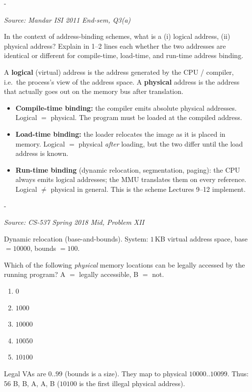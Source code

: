 \documentclass[11pt,a4paper]{article}
\makeatletter
\newcommand{\keepspace}[1]{\par\penalty-100\begingroup
  \setlength{\dimen@}{#1}\dimen@ii\pagegoal\advance\dimen@ii-\pagetotal
  \ifdim\dimen@>\dimen@ii\ifdim\dimen@ii>\z@\vfil\fi\break\fi\endgroup}
\newcounter{qn}[section]
\newenvironment{Qn}[4]{%
  \refstepcounter{qn}\keepspace{7\baselineskip}%
  \begin{tcolorbox}[qboxstyle, title={Q\thesection.\theqn\ \ [#1 \textbar\ #2]\ \ #4}]%
  {\footnotesize\color{g3}\textit{Source: #3}}\par\smallskip%
}{%
  \end{tcolorbox}%
}
\newenvironment{Sol}{%
  \begin{tcolorbox}[sboxstyle, title={Solution}]%
}{%
  \end{tcolorbox}\vspace{0.35em}%
}
\makeatother
\begin{document}
\begin{Qn}{Easy-Medium}{Lect 8}{Mandar ISI 2011 End-sem, Q3(a)}{Logical vs.\ physical addresses, and compile- / load- / run-time binding}
In the context of address-binding schemes, what is a (i) logical
address, (ii) physical address? Explain in 1--2 lines each whether the
two addresses are identical or different for compile-time, load-time,
and run-time address binding.
\end{Qn}
\begin{Sol}
A \textbf{logical} (virtual) address is the address generated by the
CPU / compiler, i.e.\ the process's view of the address space. A
\textbf{physical} address is the address that actually goes out on the
memory bus after translation.

\begin{itemize}
  \item \textbf{Compile-time binding:} the compiler emits absolute
        physical addresses. Logical $=$ physical. The program must be
        loaded at the compiled address.
  \item \textbf{Load-time binding:} the loader relocates the image as
        it is placed in memory. Logical $=$ physical \emph{after}
        loading, but the two differ until the load address is known.
  \item \textbf{Run-time binding} (dynamic relocation, segmentation,
        paging): the CPU always emits logical addresses; the MMU
        translates them on every reference. Logical $\ne$ physical in
        general. This is the scheme Lectures 9--12 implement.
\end{itemize}
\end{Sol}

\begin{Qn}{Easy-Medium}{Lect 9}{CS-537 Spring 2018 Mid, Problem XII}{Which physical addresses can this base-and-bounds process touch?}
Dynamic relocation (base-and-bounds). System:
$1$\,KB virtual address space, base $=10000$, bounds $=100$.

Which of the following \emph{physical} memory locations can be legally
accessed by the running program? A $=$ legally accessible, B $=$ not.
\begin{enumerate}
  \item[56.] $0$
  \item[57.] $1000$
  \item[58.] $10000$
  \item[59.] $10050$
  \item[60.] $10100$
\end{enumerate}
\end{Qn}
\begin{Sol}
Legal VAs are $0..99$ (bounds is a size). They map to physical
$10000..10099$. Thus:
56 B, B, A, A, B
($10100$ is the first illegal physical address).
\end{Sol}
\end{document}
